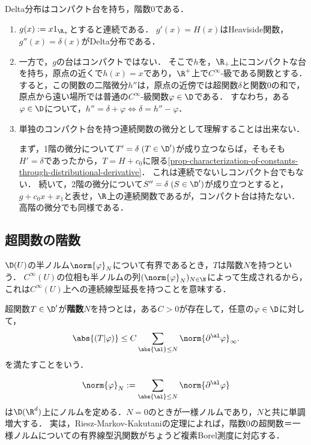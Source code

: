 \documentclass[uplatex,dvipdfmx]{jsreport}
\begin{document}
\begin{example}[Delta分布の局所関数表示]
    Delta分布はコンパクト台を持ち，階数$0$である．
    \begin{enumerate}
        \item $g(x):=x1_{\R_+}$とすると連続である．
        $g'(x)=H(x)$はHeaviside関数，$g''(x)=\delta(x)$がDelta分布である．
        \item 一方で，$g$の台はコンパクトではない．
        そこで$h$を，$\R_+$上にコンパクトな台を持ち，原点の近くで$h(x)=x$であり，$\R^+$上で$C^\infty$-級である関数とする．
        すると，この関数の二階微分$h''$は，原点の近傍では超関数$\delta$と関数$0$の和で，原点から遠い場所では普通の$C^\infty$-級関数$\varphi\in\D$である．
        すなわち，ある$\varphi\in\D$について，$h''=\delta+\varphi\Leftrightarrow\delta=h''-\varphi$．
        \item 単独のコンパクト台を持つ連続関数の微分として理解することは出来ない．
        
        まず，1階の微分について$T'=\delta\;(T\in\D')$が成り立つならば，そもそも$H'=\delta$であったから，$T=H+c_0$に限る\ref{prop-characterization-of-constants-through-distributional-derivative}．
        これは連続でないしコンパクト台でもない．
        続いて，2階の微分について$S''=\delta\;(S\in\D')$が成り立つとすると，$g+c_0x+x_1$と表せ，$\R$上の連続関数であるが，コンパクト台は持たない．
        高階の微分でも同様である．
    \end{enumerate}
\end{example}

\subsection{超関数の階数}

\begin{tcolorbox}[colframe=ForestGreen, colback=ForestGreen!10!white,breakable,colbacktitle=ForestGreen!40!white,coltitle=black,fonttitle=\bfseries\sffamily,
title=]
    $\D(U)$の半ノルム$\norm{\varphi}_N$について有界であるとき，$T$は階数$N$を持つという．
    $C^\infty(U)$の位相も半ノルムの列$(\norm{\varphi}_N)_{N\in\N}$によって生成されるから，これは$C^\infty(U)$上への連続線型延長を持つことを意味する．
\end{tcolorbox}

\begin{definition}[order]
    超関数$T\in\D'$が\textbf{階数$N$}を持つとは，ある$C>0$が存在して，任意の$\varphi\in\D$に対して，
    \[\abs{(T|\varphi)}\le C\sum_{\abs{\al}\le N}\norm{\partial^\al\varphi}_\infty.\]
    を満たすことをいう．
\end{definition}
\begin{remarks}[複素Borel測度の一般化]
    \[\norm{\varphi}_N:=\sum_{\abs{\al}\le N}\norm{\partial^\al\varphi}\]
    は$\D(\R^d)$上にノルムを定める．$N=0$のときが一様ノルムであり，$N$と共に単調増大する．
    実は，Riesz-Markov-Kakutaniの定理によれば，階数$0$の超関数＝一様ノルムについての有界線型汎関数がちょうど複素Borel測度に対応する．
\end{remarks}
\end{document}
